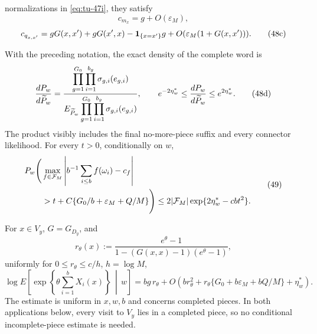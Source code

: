 normalizations in \eqref{eq:tu-47i}, they satisfy
\begin{equation}
 c_{m_x}=g+O(\varepsilon_M),                                \tag{48b}\label{eq:tu-48b}
\end{equation}
\begin{equation}
 c_{q_{x,x'}}=gG(x,x')+gG(x',x)-{\bf1}_{\{x=x'\}}g
       +O(\varepsilon_M(1+G(x,x'))).                        \tag{48c}\label{eq:tu-48c}
\end{equation}
\begin{lemma}\label{lem:terminal-feynman-kac}
With the preceding notation, the exact density of the complete word is
\begin{equation}
 {dP_w\over d\widetilde P_w}
 ={\displaystyle\prod_{g=1}^{G_0}\prod_{i=1}^{b_g}
          \sigma_{g,i}(e_{g,i})\over
   \displaystyle E_{\widetilde P_w}
       \prod_{g=1}^{G_0}\prod_{i=1}^{b_g}
          \sigma_{g,i}(e_{g,i})},
\qquad
 e^{-2\eta_w^*}\le
 {dP_w\over d\widetilde P_w}
 \le e^{2\eta_w^*}.                                        \tag{48d}\label{eq:tu-48d}
\end{equation}
The product visibly includes the final no-more-piece suffix and every
connector likelihood.  For every \(t>0\), conditionally on \(w\),
\begin{equation}
\begin{split}
P_w\Bigg(&\max_{f\in{\cal F}_M}\left|
 b^{-1}\sum_{i\le b}f(\omega_i)-c_f\right|\\
&>t+C\{G_0/b+\varepsilon_M+Q/M\}\Bigg)
 \le2|{\cal F}_M|\exp\{2\eta_w^*-cbt^2\}.                   \end{split}
\tag{49}\label{eq:tu-49}
\end{equation}

For \(x\in V_y\), \(G=G_{D_y}\), and
\begin{equation}
 r_\theta(x):=
 \frac{e^\theta-1}
 {1-(G(x,x)-1)(e^\theta-1)},                                 \tag{39}\label{eq:tu-39}
\end{equation}
uniformly for \(0\le r_\theta\le c/h\), \(h=\log M\),
\begin{equation}
 \log E\left[\exp\left\{\theta\sum_{i=1}^bX_i(x)\right\}
             \,\middle|\,w\right]
       =bg\,r_\theta+O\left(br_\theta^2+
       r_\theta\{G_0+b\varepsilon_M+bQ/M\}
                    +\eta_w^*\right).                       \tag{50}\label{eq:tu-50}
\end{equation}
The estimate is uniform in \(x,w,b\) and concerns completed pieces.
In both applications below, every visit to \(V_y\) lies in a completed
piece, so no conditional incomplete-piece estimate is needed.


\end{lemma}
